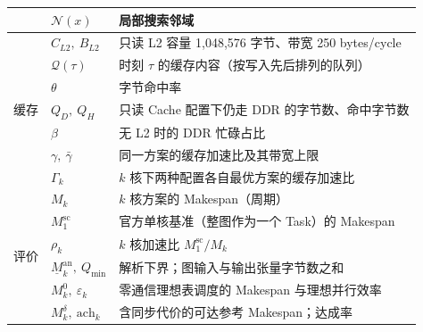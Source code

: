 \begin{footnotesize}
\begin{longtable}{c p{3.3cm} p{9.6cm}}
 & $\mathcal{N}(x)$ & 局部搜索邻域 \\
\midrule
\multirow{7}{*}{缓存}
 & $C_{L2},\ B_{L2}$ & 只读 L2 容量 1{,}048{,}576 字节、带宽 250 bytes/cycle \\
 & $\mathcal{Q}(\tau)$ & 时刻 $\tau$ 的缓存内容（按写入先后排列的队列） \\
 & $\theta$ & 字节命中率 \\
 & $Q_D,\ Q_H$ & 只读 Cache 配置下仍走 DDR 的字节数、命中字节数 \\
 & $\beta$ & 无 L2 时的 DDR 忙碌占比 \\
 & $\gamma,\ \bar\gamma$ & 同一方案的缓存加速比及其带宽上限 \\
 & $\Gamma_k$ & $k$ 核下两种配置各自最优方案的缓存加速比 \\
\midrule
\multirow{7}{*}{评价}
 & $M_k$ & $k$ 核方案的 Makespan（周期） \\
 & $M_1^{\mathrm{sc}}$ & 官方单核基准（整图作为一个 Task）的 Makespan \\
 & $\rho_k$ & $k$ 核加速比 $M_1^{\mathrm{sc}}/M_k$ \\
 & $\underline{M}_k^{\mathrm{an}},\ Q_{\min}$ & 解析下界；图输入与输出张量字节数之和 \\
 & $M_k^{0},\ \varepsilon_k$ & 零通信理想表调度的 Makespan 与理想并行效率 \\
 & $M_k^{\delta},\ \mathrm{ach}_k$ & 含同步代价的可达参考 Makespan；达成率 \\
\end{longtable}
\end{footnotesize}
